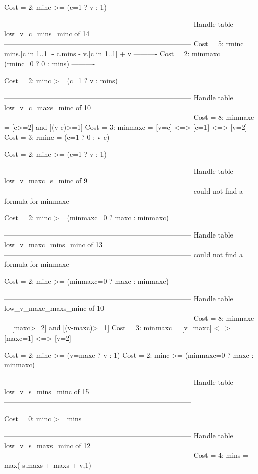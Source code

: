 Cost =  2:  minc >= (c=1 ? v : 1)

--------------------------------------------------------------------------------
Handle table low_v_c_mins_minc of 14
--------------------------------------------------------------------------------
Cost =  5:  rminc   = mins.[c in 1..1] - c.mins - v.[c in 1..1] + v
----------
Cost =  2:  minmaxc = (rminc=0 ? 0 : mins)
----------

Cost =  2:  minc >= (c=1 ? v : mins)

--------------------------------------------------------------------------------
Handle table low_v_c_maxs_minc of 10
--------------------------------------------------------------------------------
Cost =  8:  minmaxc = [c>=2] and [(v-c)>=1]
Cost =  3:  minmaxc = [v=c] <=> [c=1] <=> [v=2]
Cost =  3:  rminc   = (c=1 ? 0 : v-c)
----------

Cost =  2:  minc >= (c=1 ? v : 1)

--------------------------------------------------------------------------------
Handle table low_v_maxc_s_minc of 9
--------------------------------------------------------------------------------
could not find a formula for minmaxc

Cost =  2:  minc >= (minmaxc=0 ? maxc : minmaxc)

--------------------------------------------------------------------------------
Handle table low_v_maxc_mins_minc of 13
--------------------------------------------------------------------------------
could not find a formula for minmaxc

Cost =  2:  minc >= (minmaxc=0 ? maxc : minmaxc)

--------------------------------------------------------------------------------
Handle table low_v_maxc_maxs_minc of 10
--------------------------------------------------------------------------------
Cost =  8:  minmaxc = [maxc>=2] and [(v-maxc)>=1]
Cost =  3:  minmaxc = [v=maxc] <=> [maxc=1] <=> [v=2]
----------

Cost =  2:  minc >= (v=maxc ? v : 1)
Cost =  2:  minc >= (minmaxc=0 ? maxc : minmaxc)

--------------------------------------------------------------------------------
Handle table low_v_s_mins_minc of 15
--------------------------------------------------------------------------------

Cost =  0:  minc >= mins

--------------------------------------------------------------------------------
Handle table low_v_s_maxs_minc of 12
--------------------------------------------------------------------------------
Cost =  4:  mins = max(-s.maxs + maxs + v,1)
----------

